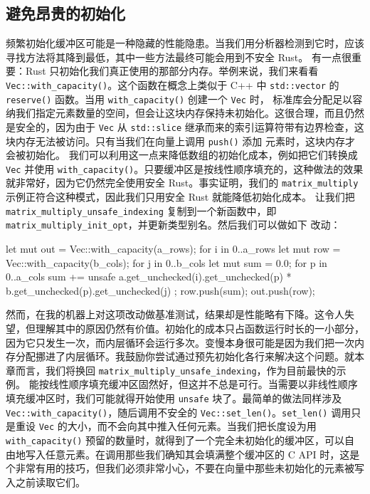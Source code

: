 \subsection{避免昂贵的初始化}
\label{idx:idx_7a94d94e}
频繁初始化缓冲区可能是一种隐藏的性能隐患。当我们用分析器检测到它时，应该寻找方法将其降到最低，其中一些方法最终可能会用到不安全 Rust。
有一点很重要：Rust 只初始化我们真正使用的那部分内存。举例来说，我们来看看 \texttt{Vec::\allowbreak{}with\_\allowbreak{}capacity(\allowbreak{})\allowbreak{}}。这个函数在概念上类似于
C++ 中 \texttt{std::vector} 的 \texttt{reserve()} 函数。当用 \texttt{with\_\allowbreak{}capacity(\allowbreak{})\allowbreak{}} 创建一个 \texttt{Vec} 时，
标准库会分配足以容纳我们指定元素数量的空间，但会让这块内存保持未初始化。这很合理，而且仍然是安全的，因为由于 \texttt{Vec} 从
\texttt{std::slice} 继承而来的索引运算符带有边界检查，这块内存无法被访问。只有当我们在向量上调用 \texttt{push()} 添加
元素时，这块内存才会被初始化。
\label{idx:idx_9cb8022b}
我们可以利用这一点来降低数组的初始化成本，例如把它们转换成 \texttt{Vec} 并使用 \texttt{with\_\allowbreak{}capacity(\allowbreak{})\allowbreak{}}。只要缓冲区是按线性顺序填充的，这种做法的效果就非常好，因为它仍然完全使用安全 Rust。事实证明，我们的 \texttt{matrix\_\allowbreak{}multiply} 示例正符合这种模式，因此我们只用安全 Rust 就能降低初始化成本。
让我们把 \texttt{matrix\_\allowbreak{}multiply\_\allowbreak{}unsafe\_\allowbreak{}indexing} 复制到一个新函数中，即
\texttt{matrix\_\allowbreak{}multiply\_\allowbreak{}init\_\allowbreak{}opt}，并更新类型别名。然后我们可以做如下
改动：
\begin{codebox}[rust]
let mut out = Vec::with_capacity(a_rows);
 for i in 0..a_rows {
       let mut row = Vec::with_capacity(b_cols);
       for j in 0..b_cols {
             let mut sum = 0.0;
             for p in 0..a_cols {
                   sum += unsafe {
                         a.get_unchecked(i).get_unchecked(p) *
b.get_unchecked(p).get_unchecked(j)
                   };
             }
             row.push(sum);
       }
       out.push(row);
 }
\end{codebox}
然而，在我的机器上对这项改动做基准测试，结果却是性能略有下降。这令人失望，但理解其中的原因仍然有价值。初始化的成本只占函数运行时长的一小部分，因为它只发生一次，而内层循环会运行多次。变慢本身很可能是因为我们把一次内存分配挪进了内层循环。我鼓励你尝试通过预先初始化各行来解决这个问题。就本章而言，我们将换回 \texttt{matrix\_\allowbreak{}multiply\_\allowbreak{}unsafe\_\allowbreak{}indexing}，作为目前最快的示例。
能按线性顺序填充缓冲区固然好，但这并不总是可行。当需要以非线性顺序填充缓冲区时，我们可能就得开始使用 \texttt{unsafe} 块了。最简单的做法同样涉及 \texttt{Vec::\allowbreak{}with\_\allowbreak{}capacity(\allowbreak{})\allowbreak{}}，随后调用不安全的 \texttt{Vec::\allowbreak{}set\_\allowbreak{}len(\allowbreak{})\allowbreak{}}。\texttt{set\_len()} 调用只是重设 \texttt{Vec} 的大小，而不会向其中推入任何元素。当我们把长度设为用 \texttt{with\_\allowbreak{}capacity(\allowbreak{})\allowbreak{}} 预留的数量时，就得到了一个完全未初始化的缓冲区，可以自由地写入任意元素。在调用那些我们确知其会填满整个缓冲区的 C API 时，这是个非常有用的技巧，但我们必须非常小心，不要在向量中那些未初始化的元素被写入之前读取它们。
